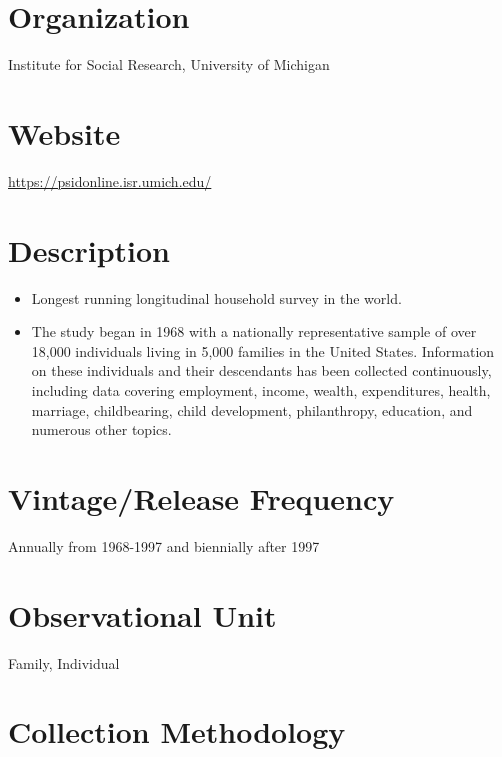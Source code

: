 \documentclass[
]{book}
\providecommand{\tightlist}{%
  \setlength{\itemsep}{0pt}\setlength{\parskip}{0pt}}
\begin{document}
\hypertarget{organization-72}{%
\section{Organization}\label{organization-72}}

Institute for Social Research, University of Michigan

\hypertarget{website-72}{%
\section{Website}\label{website-72}}

\url{https://psidonline.isr.umich.edu/}

\hypertarget{description-72}{%
\section{Description}\label{description-72}}

\begin{itemize}
\tightlist
\item
  Longest running longitudinal household survey in the world.
\item
  The study began in 1968 with a nationally representative sample of over 18,000 individuals living in 5,000 families in the United States. Information on these individuals and their descendants has been collected continuously, including data covering employment, income, wealth, expenditures, health, marriage, childbearing, child development, philanthropy, education, and numerous other topics.
\end{itemize}

\hypertarget{vintagerelease-frequency-72}{%
\section{Vintage/Release Frequency}\label{vintagerelease-frequency-72}}

Annually from 1968-1997 and biennially after 1997

\hypertarget{observational-unit-72}{%
\section{Observational Unit}\label{observational-unit-72}}

Family, Individual

\hypertarget{collection-methodology-72}{%
\section{Collection Methodology}\label{collection-methodology-72}}
\end{document}
